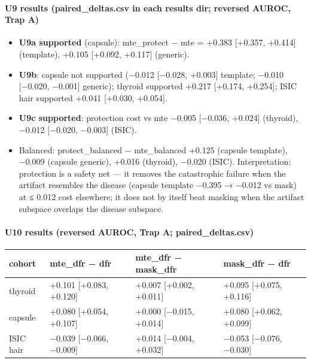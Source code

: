{\paragraph{U9 results (paired\_deltas.csv in each results dir; reversed AUROC, Trap A)}\label{u9-results-paired_deltascsv-in-each-results-dir-reversed-auroc-trap-a}

\begin{itemize}

\item
  \textbf{U9a supported} (capsule): mte\_protect − mte = +0.383 {[}+0.357, +0.414{]} (template), +0.105 {[}+0.092, +0.117{]} (generic).
\item
  \textbf{U9b}: capsule not supported (−0.012 {[}−0.028, +0.003{]} template; −0.010 {[}−0.020, −0.001{]} generic);
  thyroid supported +0.217 {[}+0.174, +0.254{]}; ISIC hair supported +0.041 {[}+0.030, +0.054{]}.
\item
  \textbf{U9c supported}: protection cost vs mte −0.005 {[}−0.036, +0.024{]} (thyroid), −0.012 {[}−0.020, −0.003{]} (ISIC).
\item
  Balanced: protect\_balanced − mte\_balanced +0.125 (capsule template), −0.009 (capsule generic), +0.016 (thyroid),
  −0.020 (ISIC).
  Interpretation: protection is a safety net --- it removes the catastrophic failure when the artifact resembles the
  disease (capsule template −0.395 → −0.012 vs mask) at ≤ 0.012 cost elsewhere; it does not by itself beat masking
  when the artifact subspace overlaps the disease subspace.
\end{itemize}

\paragraph{U10 results (reversed AUROC, Trap A; paired\_deltas.csv)}\label{u10-results-reversed-auroc-trap-a-paired_deltascsv}

{ %
\begin{longtable}[]{@{}llll@{}}
\toprule\noalign{}
cohort & mte\_dfr − dfr & mte\_dfr − mask\_dfr & mask\_dfr − dfr \\
\midrule\noalign{}
\endhead
\bottomrule\noalign{}
\endlastfoot
thyroid & +0.101 {[}+0.083, +0.120{]} & +0.007 {[}+0.002, +0.011{]} & +0.095 {[}+0.075, +0.116{]} \\
capsule & +0.080 {[}+0.054, +0.107{]} & +0.000 {[}−0.015, +0.014{]} & +0.080 {[}+0.062, +0.099{]} \\
ISIC hair & −0.039 {[}−0.066, −0.009{]} & +0.014 {[}−0.004, +0.032{]} & −0.053 {[}−0.076, −0.030{]} \\
\end{longtable}
}

}
